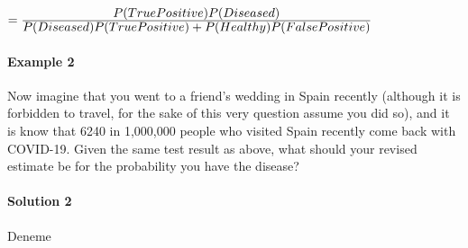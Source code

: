 \documentclass[12pt]{article}
\begin{document}
    $ =\frac{\displaystyle P(True Positive)P(Diseased)}{\displaystyle P(Diseased)P(True Positive) + P(Healthy)P(False Positive)}$

\paragraph{Example 2}
Now imagine that you went to a friend’s wedding in Spain recently (although it is forbidden to travel, for the sake of this very question assume you did so), and it is know that 6240 in 1,000,000 people who visited Spain recently come back with COVID-19. Given the same test result as above, what should your revised estimate be for the probability you have the disease?

\paragraph{Solution 2}
Deneme
\end{document}
